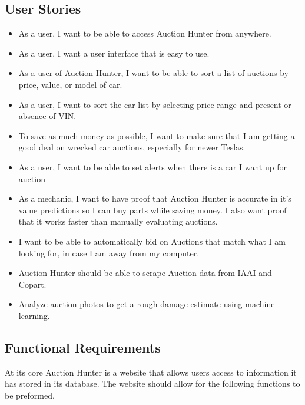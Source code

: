 \documentclass[draftclsnofoot,onecolumn,10pt]{IEEEtran}
\begin{document}

\subsection{User Stories}
\begin{itemize}
\item As a user, I want to be able to access Auction Hunter from anywhere.
\item As a user, I want a user interface that is easy to use.
\item As a user of Auction Hunter, I want to be able to sort a list of auctions by price, value, or model of car. 
\item As a user, I want to sort the car list by selecting price range and present or absence of VIN. 
\item To save as much money as possible, I want to make sure that I am getting a good deal on wrecked car auctions, especially for newer Teslas.
\item As a user, I want to be able to set alerts when there is a car I want up for auction
\item As a mechanic, I want to have proof that Auction Hunter is accurate in it's value predictions so I can buy parts while saving money. I also want proof that it works faster than manually evaluating auctions.
\item I want to be able to automatically bid on Auctions that match what I am looking for, in case I am away from my computer.
\item Auction Hunter should be able to scrape Auction data from IAAI and Copart.
\item Analyze auction photos to get a rough damage estimate using machine learning. 
\end{itemize}

\subsection{Functional Requirements}
At its core Auction Hunter is a website that allows users access to information it has stored in its database. The website should allow for the following functions to be preformed.
\end{document}

